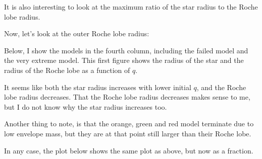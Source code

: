 \documentclass[a4paper,10pt]{article}
\begin{document}
\begin{figure}[ht]
    \centering
\end{figure}
\nextpage
It is also interesting to look at the maximum ratio of the star radius to the Roche lobe radius.
\begin{figure}[ht]
    \centering
\end{figure}


\begin{figure}[ht]
    \centering
\end{figure}

Now, let's look at the outer Roche lobe radius:
\begin{figure}[ht]
    \centering
\end{figure}

Below, I show the models in the fourth column, including the failed model and the very extreme model. This first figure shows the radius of the star and the radius of the Roche lobe as a function of \(q\).
\begin{figure}[ht]
    \centering
\end{figure}

It seems like both the star radius increases with lower initial \(q\), and the Roche lobe radius decreases. That the Roche lobe radius decreases makes sense to me, but I do not know why the star radius increases too.

Another thing to note, is that the orange, green and red model terminate due to low envelope mass, but they are at that point still larger than their Roche lobe. 

In any case, the plot below shows the same plot as above, but now as a fraction.
\begin{figure}[ht]
    \centering
\end{figure}
\end{document}
